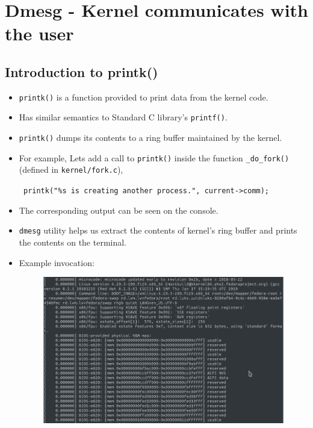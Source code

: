 \documentclass{beamer}
\begin{document}
\section{Dmesg - Kernel communicates with the user}
\subsection{Introduction to printk()}
\begin{frame}
  \begin{itemize}
  \item \texttt{printk()} is a function provided to print data from the kernel
    code.
  \item Has similar semantics to Standard C library's \texttt{printf()}.

  \item \texttt{printk()} dumps its contents to a ring buffer maintained by
    the kernel.
  \item For example, Lets add a call to \texttt{printk()} inside the function
    \texttt{\_do\_fork()} (defined in \texttt{kernel/fork.c}),

  {\centering \texttt{ printk("\%s is creating another process.",
      current->comm);}} 
\item The corresponding output can be seen on the console.
  \end{itemize}
\end{frame}

\begin{frame}
  \begin{itemize}
  \item \texttt{dmesg} utility helps us extract the contents of kernel's ring
    buffer and prints the contents on the terminal.
  \item Example invocation:
    \begin{figure}[h!]
      \centering
      \includegraphics[scale=0.3]{images/dmesg-0.png}
    \end{figure}
  \end{itemize}
\end{frame}
\end{document}
